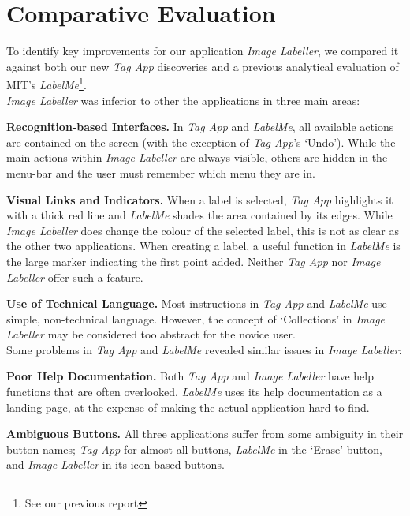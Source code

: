 \documentclass[11pt,twocolumn]{article}
\begin{document}
\section{Comparative Evaluation}

To identify key improvements for our application \emph{Image Labeller}, we compared it against both our new \emph{Tag App} discoveries and a previous analytical evaluation of MIT’s \emph{LabelMe}\footnote{See our previous
report}.\\

\noindent \emph{Image Labeller} was inferior to other the applications in three main areas:

\textbf{Recognition-based Interfaces.} In \emph{Tag App} and \emph{LabelMe}, all available actions are contained on the screen (with the exception of \emph{Tag App}’s `Undo'). While the main actions within \emph{Image Labeller} are always visible,
others are hidden in the menu-bar and the user must remember which menu they are in. 

\textbf{Visual Links and Indicators.} When a label is selected, \emph{Tag App}
highlights it with a thick red line and \emph{LabelMe} shades the area contained by
its edges. While \emph{Image Labeller} does change the colour of the selected label,
this is not as clear as the other two applications. When creating a label, a
useful function in \emph{LabelMe} is the large marker indicating the first point
added. Neither \emph{Tag App} nor \emph{Image Labeller} offer such a feature.

\textbf{Use of Technical Language.} Most instructions in \emph{Tag App} and
\emph{LabelMe} use simple, non-technical language. However, the concept of
`Collections' in \emph{Image Labeller} may be considered too abstract for the novice
user. \\

\noindent Some problems in \emph{Tag App} and \emph{LabelMe} revealed similar issues
in \emph{Image Labeller}:

\textbf{Poor Help Documentation.} Both \emph{Tag App} and \emph{Image Labeller} have
help functions that are often overlooked. \emph{LabelMe} uses its help documentation
as a landing page, at the expense of making the actual application hard to
find. 

\textbf{Ambiguous Buttons.} All three applications suffer from some
ambiguity in their button names; \emph{Tag App} for almost all buttons, \emph{LabelMe} in the
`Erase' button, and \emph{Image Labeller} in its icon-based buttons. \\
\end{document}
